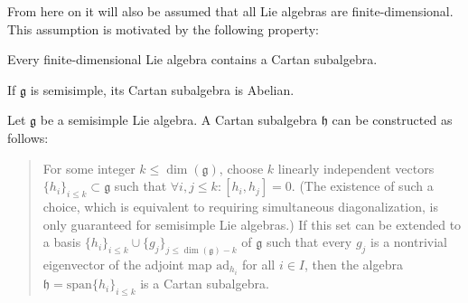     From here on it will also be assumed that all Lie algebras are finite-dimensional. This assumption is motivated by the following property:
    \begin{property}
        Every finite-dimensional Lie algebra contains a Cartan subalgebra.
    \end{property}
    \begin{property}
       If $\mathfrak{g}$ is semisimple, its Cartan subalgebra is Abelian.
    \end{property}

    \begin{construct}
        Let $\mathfrak{g}$ be a semisimple Lie algebra. A Cartan subalgebra $\mathfrak{h}$ can be constructed as follows:
        \begin{quote}
            For some integer $k\leq\dim(\mathfrak{g})$, choose $k$ linearly independent vectors $\{h_i\}_{i\leq k}\subset\mathfrak{g}$ such that $\forall i,j\leq k:[h_i,h_j] = 0$. (The existence of such a choice, which is equivalent to requiring simultaneous diagonalization, is only guaranteed for semisimple Lie algebras.) If this set can be extended to a basis $\{h_i\}_{i\leq k}\cup\{g_j\}_{j\leq \dim(\mathfrak{g})-k}$ of $\mathfrak{g}$ such that every $g_j$ is a nontrivial eigenvector of the adjoint map $\mathrm{ad}_{h_i}$ for all $i\in I$, then the algebra $\mathfrak{h} = \mathrm{span}\{h_i\}_{i\leq k}$ is a Cartan subalgebra.
        \end{quote}
    \end{construct}


